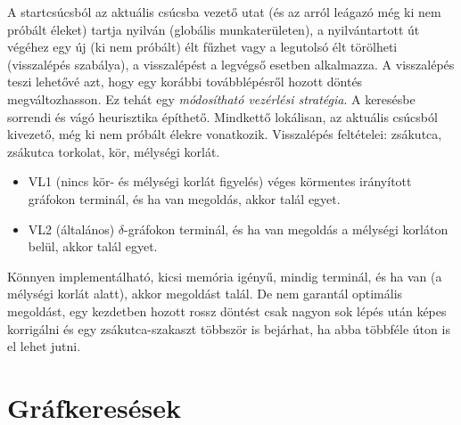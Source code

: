 \documentclass[margin=0px]{article}
\begin{document}
	A startcsúcsból az aktuális csúcsba vezető utat (és az arról leágazó még ki nem próbált éleket) tartja nyilván (globális munkaterületen), a nyilvántartott út végéhez egy új (ki nem próbált) élt fűzhet vagy a legutolsó élt törölheti (visszalépés szabálya), a visszalépést a legvégső esetben alkalmazza. A visszalépés teszi lehetővé azt, hogy egy korábbi továbblépésről hozott döntés megváltozhasson. Ez tehát egy \textit{módosítható vezérlési stratégia}. A keresésbe sorrendi és vágó heurisztika építhető. Mindkettő lokálisan, az aktuális csúcsból kivezető, még ki nem próbált élekre vonatkozik.
	Visszalépés feltételei: zsákutca, zsákutca torkolat, kör, mélységi korlát.
	\begin{itemize}
		\item VL1 (nincs kör- és mélységi korlát figyelés) véges körmentes irányított gráfokon terminál, és ha van megoldás, akkor talál egyet.
		\item VL2 (általános) $\delta$-gráfokon terminál, és ha van megoldás a mélységi korláton belül, akkor talál egyet.
	\end{itemize}
	Könnyen implementálható, kicsi memória igényű, mindig terminál, és ha van (a mélységi korlát alatt), akkor megoldást talál. De nem garantál optimális megoldást, egy kezdetben hozott rossz döntést csak nagyon sok lépés után képes korrigálni és egy zsákutca-szakaszt többször is bejárhat, ha abba többféle úton is el lehet jutni.
		
	\section{Gráfkeresések}
	
\end{document}

